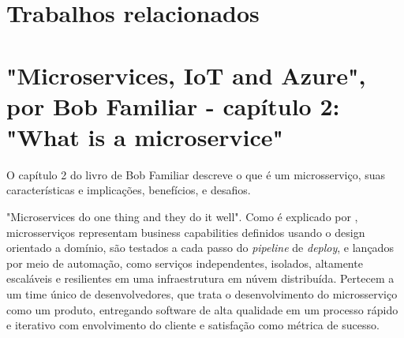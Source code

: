 
\section{Trabalhos relacionados}

\section*{"Microservices, IoT and Azure", por Bob Familiar - capítulo 2: "What is a microservice"}

O capítulo 2 do livro de Bob Familiar descreve o que é um microsserviço, suas características e implicações, benefícios, e desafios. 

"Microservices do one thing and they do it well". Como é explicado por  , microsserviços representam business capabilities definidos usando o design orientado a domínio, são testados a cada passo do \emph{pipeline} de \emph{deploy}, e lançados por meio de automação, como serviços independentes, isolados, altamente escaláveis e resilientes em uma infraestrutura em núvem distribuída. Pertecem a um time único de desenvolvedores, que trata o desenvolvimento do microsserviço como um produto, entregando software de alta qualidade em um processo rápido e iterativo com envolvimento do cliente e satisfação como métrica de sucesso.

